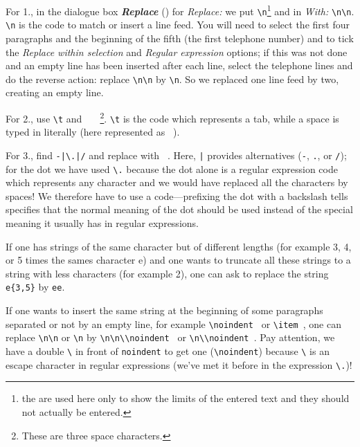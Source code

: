 For 1., in the dialogue box \textsl{\textbf{Replace}} () for \emph{Replace:} we put {\frq\verb+\n+\flq}\footnote{the {\frq\flq} are used here only to show the limits of the entered text and they should not actually be entered.} and in \emph{With:} {\frq\verb+\n\n+\flq}. {\frq\verb+\n+\flq} is the code to match or insert a line feed. You will need to select the first four paragraphs and the beginning of the fifth (the first telephone number) and to tick the \emph{Replace within selection} and \emph{Regular expression} options; if this was not done and an empty line has been inserted after each line, select the telephone lines and do the reverse action: replace {\frq\verb+\n\n+\flq} by {\frq\verb+\n+\flq}. So we replaced one line feed by two, creating an empty line.

For 2., use {\frq\verb+\t+\flq} and {\frq\verb*+   +\flq}\footnote{These are three space characters.}. {\frq\verb+\t+\flq} is the code which represents a tab, while a space is typed in literally (here represented as \verb*| |).

For 3., find {\frq\verb+-|\.|/+\flq} and replace with {\frq\verb*+ +\flq}. Here, {\frq\verb+|+\flq} provides alternatives (\verb|-|, \verb|.|, or \verb|/|); for the dot we have used {\frq\verb+\.+\flq} because the dot alone is a regular expression code which represents any character and we would have replaced all the characters by spaces! We therefore have to use a code---prefixing the dot with a backslash tells specifies that the normal meaning of the dot should be used instead of the special meaning it usually has in regular expressions.

If one has strings of the same character but of different lengths (for example 3, 4, or 5 times the sames character e) and one wants to truncate all these strings to a string with less characters (for example 2), one can ask to replace the string {\frq\verb+e{3,5}+\flq} by {\frq\verb+ee+\flq}.

If one wants to insert the same string at the beginning of some paragraphs separated or not by an empty line, for example {\frq\verb*+\noindent +\flq} or {\frq\verb*+\item +\flq}, one can replace {\frq\verb+\n\n+\flq} or {\frq\verb+\n+\flq} by {\frq\verb*+\n\n\\noindent +\flq} or {\frq\verb*+\n\\noindent +\flq}. Pay attention, we have a double \verb|\| in front of \verb|noindent| to get one (\verb|\noindent|) because \verb|\| is an escape character in regular expressions (we've met it before in the expression \verb|\.|)!

